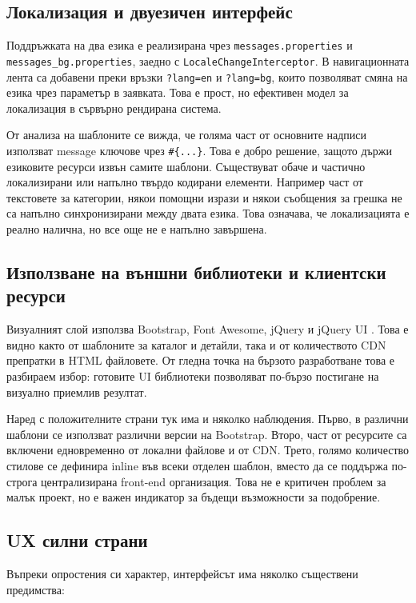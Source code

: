 \subsection{Локализация и двуезичен интерфейс}

Поддръжката на два езика е реализирана чрез \texttt{messages.properties} и \texttt{messages\_bg.properties}, заедно с \texttt{LocaleChangeInterceptor}. В навигационната лента са добавени преки връзки \texttt{?lang=en} и \texttt{?lang=bg}, които позволяват смяна на езика чрез параметър в заявката. Това е прост, но ефективен модел за локализация в сървърно рендирана система.

От анализа на шаблоните се вижда, че голяма част от основните надписи използват message ключове чрез \texttt{\#\{...\}}. Това е добро решение, защото държи езиковите ресурси извън самите шаблони. Съществуват обаче и частично локализирани или напълно твърдо кодирани елементи. Например част от текстовете за категории, някои помощни изрази и някои съобщения за грешка не са напълно синхронизирани между двата езика. Това означава, че локализацията е реално налична, но все още не е напълно завършена.

\subsection{Използване на външни библиотеки и клиентски ресурси}

Визуалният слой използва Bootstrap, Font Awesome, jQuery и jQuery UI \cite{bootstrap,jquery}. Това е видно както от шаблоните за каталог и детайли, така и от количеството CDN препратки в HTML файловете. От гледна точка на бързото разработване това е разбираем избор: готовите UI библиотеки позволяват по-бързо постигане на визуално приемлив резултат.

Наред с положителните страни тук има и няколко наблюдения. Първо, в различни шаблони се използват различни версии на Bootstrap. Второ, част от ресурсите са включени едновременно от локални файлове и от CDN. Трето, голямо количество стилове се дефинира inline във всеки отделен шаблон, вместо да се поддържа по-строга централизирана front-end организация. Това не е критичен проблем за малък проект, но е важен индикатор за бъдещи възможности за подобрение.

\subsection{UX силни страни}

Въпреки опростения си характер, интерфейсът има няколко съществени предимства:

